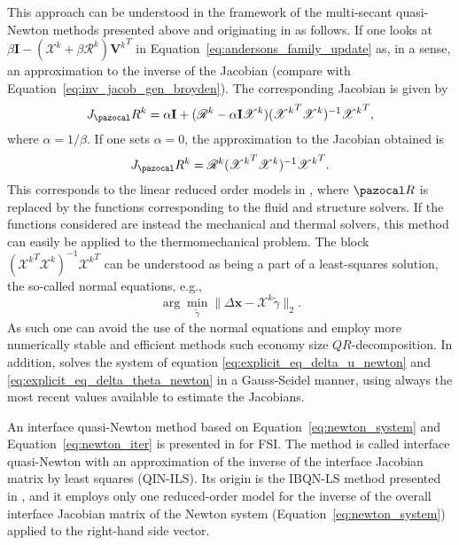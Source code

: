 This approach can be understood in the framework of the multi-secant quasi-Newton methods presented above and originating in \cite{fang_two_2009} as follows.
If one looks at \(\beta\mathbf I - (\mathscr X^k + \beta\mathscr R^k){\mathbf V^k}^T\) in Equation~\eqref{eq:andersons_family_update} as, in a sense, an approximation to the inverse of the Jacobian (compare with Equation~\eqref{eq:inv_jacob_gen_broyden}).
The corresponding Jacobian is given by
\begin{equation}
  J_\pazocal R^k = \alpha\mathbf I + (\mathscr R^k - \alpha\mathbf I\mathscr X^k )({\mathscr X^k}^T\mathscr X^k)^{-1}{\mathscr X^k}^T,
\end{equation}
where \(\alpha=1/\beta\).
If one sets \(\alpha=0\), the approximation to the Jacobian obtained is
\begin{equation}
  J_\pazocal R^k = \mathscr R^k({\mathscr X^k}^T\mathscr X^k)^{-1}{\mathscr X^k}^T.
\end{equation}
This corresponds to the linear reduced order models in \cite{vierendeels_implicit_2007}, where \(\pazocal R\) is replaced by the functions corresponding to the fluid and structure solvers.
If the functions considered are instead the mechanical and thermal solvers, this method can easily be applied to the thermomechanical problem.
The block \(({\mathscr X^k}^T\mathscr X^k)^{-1}{\mathscr X^k}^T\) can be understood as being a part of a least-squares solution, the so-called normal equations, e.g.,
\begin{equation}
  \arg\min_{\tilde{\gamma}} \|\Delta \mathbf x - \mathscr{X}^k\tilde{\gamma}\|_2.
\end{equation}
As such one can avoid the use of the normal equations and employ more numerically stable and efficient methods such economy size \(QR\)-decomposition.
In addition, \cite{vierendeels_implicit_2007} solves the system of equation \eqref{eq:explicit_eq_delta_u_newton} and \eqref{eq:explicit_eq_delta_theta_newton} in a Gauss-Seidel manner, using always the most recent values available to estimate the Jacobians.

An interface quasi-Newton method based on Equation~\eqref{eq:newton_system} and Equation~\eqref{eq:newton_iter} is presented in \cite{degroote_development_2010} for FSI.
The method is called interface quasi-Newton with an approximation of the inverse of the interface Jacobian matrix by least squares (QIN-ILS).
Its origin is the IBQN-LS method presented in \cite{vierendeels_implicit_2007}, and it employs only one reduced-order model for the inverse of the overall interface Jacobian matrix of the Newton system (Equation~\eqref{eq:newton_system}) applied to the right-hand side vector.

